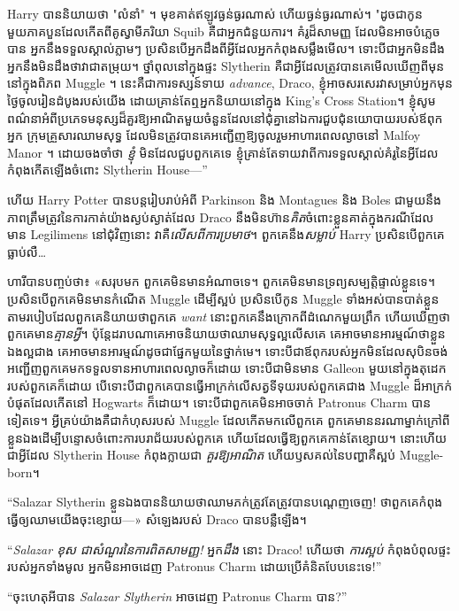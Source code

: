 {{{Harry បាននិយាយថា "លំនាំ" ។ មុខ​គាត់​ឥឡូវ​ធ្ងន់ធ្ងរ​ណាស់ ហើយ​ធ្ងន់ធ្ងរ​ណាស់។ "ដូចជាកូនមួយភាគបួនដែលកើតពីគូស្វាមីភរិយា Squib គឺជាអ្នកជំនួយការ។ គំរូដ៏សាមញ្ញ ដែលមិនអាចបំភ្លេចបាន អ្នកនឹងទទួលស្គាល់ភ្លាមៗ ប្រសិនបើអ្នកដឹងពីអ្វីដែលអ្នកកំពុងសម្លឹងមើល។ ទោះ​បី​ជា​អ្នក​មិន​ដឹង អ្នក​នឹង​មិន​ដឹង​ថា​វា​ជា​តម្រុយ។ ថ្នាំពុលនៅក្នុងផ្ទះ Slytherin គឺជាអ្វីដែលត្រូវបានគេមើលឃើញពីមុននៅក្នុងពិភព Muggle ។ នេះគឺជាការទស្សន៍ទាយ \emph{advance}, Draco, ខ្ញុំអាចសរសេរវាសម្រាប់អ្នកមុនថ្ងៃចូលរៀនដំបូងរបស់យើង ដោយគ្រាន់តែឮអ្នកនិយាយនៅក្នុង King's Cross Station។ ខ្ញុំសូមពណ៌នាអំពីប្រភេទមនុស្សដ៏គួរឱ្យអាណិតមួយចំនួនដែលនៅជុំគ្នានៅឯការជួបជុំនយោបាយរបស់ឪពុកអ្នក ក្រុមគ្រួសារឈាមសុទ្ធ ដែលមិនត្រូវបានគេអញ្ជើញឱ្យចូលរួមអាហារពេលល្ងាចនៅ Malfoy Manor ។ ដោយចងចាំថា \emph{ខ្ញុំ} មិនដែលជួបពួកគេទេ ខ្ញុំគ្រាន់តែទាយវាពីការទទួលស្គាល់គំរូនៃអ្វីដែលកំពុងកើតឡើងចំពោះ Slytherin House—”

ហើយ Harry Potter បានបន្តរៀបរាប់អំពី Parkinson និង Montagues និង Boles ជាមួយនឹងភាពត្រឹមត្រូវនៃការកាត់យ៉ាងស្ងប់ស្ងាត់ដែល Draco នឹងមិនហ៊ាន\emph{គិត}ចំពោះខ្លួនគាត់ក្នុងករណីដែលមាន Legilimens នៅជុំវិញនោះ វាគឺ\emph{លើសពីការប្រមាថ}។ ពួកគេនឹង\emph{សម្លាប់} Harry ប្រសិនបើពួកគេធ្លាប់លឺ…

ហារី​បាន​បញ្ចប់​ថា​៖ «​សរុប​មក ពួកគេ​មិន​មាន​អំណាច​ទេ​។ ពួកគេមិនមានទ្រព្យសម្បត្តិផ្ទាល់ខ្លួនទេ។ ប្រសិនបើពួកគេមិនមានកំណើត Muggle ដើម្បីស្អប់ ប្រសិនបើកូន Muggle ទាំងអស់បានបាត់ខ្លួនតាមរបៀបដែលពួកគេនិយាយថាពួកគេ \emph{want} នោះពួកគេនឹងក្រោកពីដំណេកមួយព្រឹក ហើយឃើញថាពួកគេមាន\emph{គ្មានអ្វី}។ ប៉ុន្តែ​ដរាបណា​គេ​អាច​និយាយ​ថា​ឈាម​សុទ្ធ​ល្អ​លើស​គេ គេ​អាច​មាន​អារម្មណ៍​ថា​ខ្លួន​ឯង​ល្អ​ជាង គេ​អាច​មាន​អារម្មណ៍​ដូច​ជា​ផ្នែក​មួយ​នៃ​ថ្នាក់​មេ។ ទោះបីជាឪពុករបស់អ្នកមិនដែលសុបិនចង់អញ្ជើញពួកគេមកទទួលទានអាហារពេលល្ងាចក៏ដោយ ទោះបីជាមិនមាន Galleon មួយនៅក្នុងតុដេករបស់ពួកគេក៏ដោយ បើទោះបីជាពួកគេបានធ្វើអាក្រក់លើសត្វទីទុយរបស់ពួកគេជាង Muggle ដ៏អាក្រក់បំផុតដែលកើតនៅ Hogwarts ក៏ដោយ។ ទោះបីជាពួកគេមិនអាចចាក់ Patronus Charm បានទៀតទេ។ អ្វីគ្រប់យ៉ាងគឺជាកំហុសរបស់ Muggle ដែលកើតមកលើពួកគេ ពួកគេមាននរណាម្នាក់ក្រៅពីខ្លួនឯងដើម្បីបន្ទោសចំពោះការបរាជ័យរបស់ពួកគេ ហើយដែលធ្វើឱ្យពួកគេកាន់តែខ្សោយ។ នោះហើយជាអ្វីដែល Slytherin House កំពុងក្លាយជា \emph{គួរឱ្យអាណិត} ហើយឫសគល់នៃបញ្ហាគឺស្អប់ Muggle-born។

“Salazar Slytherin ខ្លួនឯងបាននិយាយថាឈាមភក់ត្រូវតែត្រូវបានបណ្តេញចេញ! ថា​ពួក​គេ​កំពុង​ធ្វើ​ឲ្យ​ឈាម​យើង​ចុះ​ខ្សោយ—» សំឡេង​របស់ Draco បាន​បន្លឺ​ឡើង។

“\emph{Salazar ខុស ជាសំណួរនៃការពិតសាមញ្ញ!} អ្នក\emph{ដឹង} នោះ Draco! ហើយថា \emph{ការស្អប់} កំពុងបំពុលផ្ទះរបស់អ្នកទាំងមូល អ្នកមិនអាចដេញ Patronus Charm ដោយប្រើគំនិតបែបនេះទេ!”

“ចុះហេតុអីបាន \emph{Salazar Slytherin} អាចដេញ Patronus Charm បាន?”

}}}
